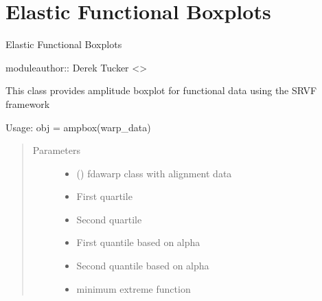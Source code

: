 \documentclass[letterpaper,10pt,english]{sphinxmanual}
\begin{document}
\chapter{Elastic Functional Boxplots}
\label{\detokenize{boxplots:module-boxplots}}\label{\detokenize{boxplots:elastic-functional-boxplots}}\label{\detokenize{boxplots::doc}}
Elastic Functional Boxplots

moduleauthor:: Derek Tucker \textless{}\textgreater{}

\begin{fulllineitems}
\label{\detokenize{boxplots:boxplots.ampbox}}
This class provides amplitude boxplot for functional data using the
SRVF framework

Usage:  obj = ampbox(warp\_data)
\begin{quote}\begin{description}
\item[{Parameters}] \leavevmode\begin{itemize}
\item {} 
 ({\hyperref[\detokenize{time_warping:time_warping.fdawarp}]{}}) \textendash{} fdawarp class with alignment data

\item {} 
 \textendash{} First quartile

\item {} 
 \textendash{} Second quartile

\item {} 
 \textendash{} First quantile based on alpha

\item {} 
 \textendash{} Second quantile based on alpha

\item {} 
 \textendash{} minimum extreme function


\end{itemize}
\end{description}
\end{quote}
\end{fulllineitems}
\end{document}
